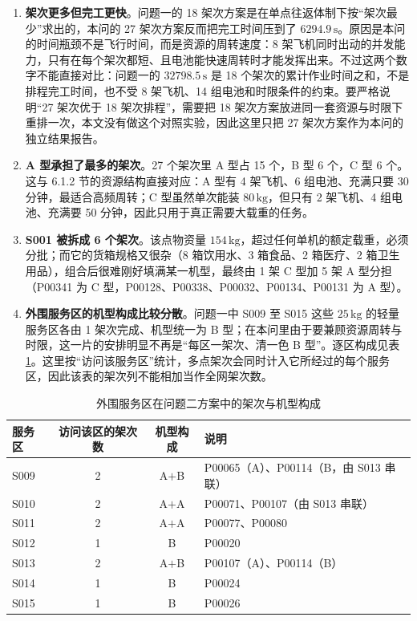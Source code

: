 \documentclass[withoutpreface,bwprint]{format}
\begin{document}
\begin{enumerate}[leftmargin=*]
    \item \textbf{架次更多但完工更快}。问题一的 18 架次方案是在单点往返体制下按“架次最少”求出的，本问的 27 架次方案反而把完工时间压到了 $6294.9\,\text{s}$。原因是本问的时间瓶颈不是飞行时间，而是资源的周转速度：8 架飞机同时出动的并发能力，只有在每个架次都短、且电池能快速周转时才能发挥出来。不过这两个数字不能直接对比：问题一的 $32798.5\,\text{s}$ 是 18 个架次的累计作业时间之和，不是排程完工时间，也不受 8 架飞机、14 组电池和时限条件的约束。要严格说明“27 架次优于 18 架次排程”，需要把 18 架次方案放进同一套资源与时限下重排一次，本文没有做这个对照实验，因此这里只把 27 架次方案作为本问的独立结果报告。
    \item \textbf{A 型承担了最多的架次}。27 个架次里 A 型占 15 个，B 型 6 个，C 型 6 个。这与 6.1.2 节的资源结构直接对应：A 型有 4 架飞机、6 组电池、充满只要 30 分钟，最适合高频周转；C 型虽然单次能装 $80\,\text{kg}$，但只有 2 架飞机、4 组电池、充满要 50 分钟，因此只用于真正需要大载重的任务。
    \item \textbf{S001 被拆成 6 个架次}。该点物资量 $154\,\text{kg}$，超过任何单机的额定载重，必须分批；而它的货箱规格又很杂（8 箱饮用水、3 箱食品、2 箱医疗、2 箱卫生用品），组合后很难刚好填满某一机型，最终由 1 架 C 型加 5 架 A 型分担（P00341 为 C 型，P00128、P00338、P00032、P00134、P00131 为 A 型）。

    \item \textbf{外围服务区的机型构成比较分散}。问题一中 S009 至 S015 这些 $25\,\text{kg}$ 的轻量服务区各由 1 架次完成、机型统一为 B 型；在本问里由于要兼顾资源周转与时限，这一片的安排明显不再是“每区一架次、清一色 B 型”。逐区构成见表 \ref{tab:q2_outer_sites}。这里按“访问该服务区”统计，多点架次会同时计入它所经过的每个服务区，因此该表的架次列不能相加当作全网架次数。
\end{enumerate}

\begin{table}[H]
\centering
\small
\caption{外围服务区在问题二方案中的架次与机型构成}
\label{tab:q2_outer_sites}
\begin{tabularx}{0.8\textwidth}{l c c >{\centering\arraybackslash}X}
\toprule
\textbf{服务区} & \textbf{访问该区的架次数} & \textbf{机型构成} & \textbf{说明} \\
\midrule
S009 & 2 & A$+$B & P00065（A）、P00114（B，由 S013 串联） \\
S010 & 2 & A$+$A & P00071、P00107（由 S013 串联） \\
S011 & 2 & A$+$A & P00077、P00080 \\
S012 & 1 & B & P00020 \\
S013 & 2 & A$+$B & P00107（A）、P00114（B） \\
S014 & 1 & B & P00024 \\
S015 & 1 & B & P00026 \\
\bottomrule
\end{tabularx}
\end{table}
\end{document}
